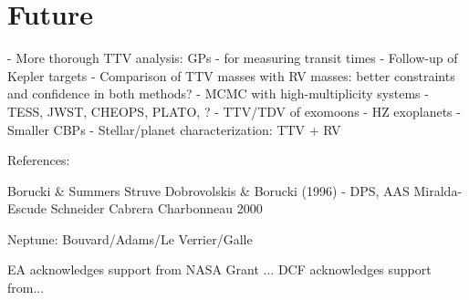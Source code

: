 \documentclass[graybox,natbib,nosecnum]{svmult}
\begin{document}
\section{Future} %
  - More thorough TTV analysis: GPs - for measuring transit times
  - Follow-up of Kepler targets
  - Comparison of TTV masses with RV masses:  better constraints
    and confidence in both methods?
  - MCMC with high-multiplicity systems
  - TESS, JWST, CHEOPS, PLATO, ?
  - TTV/TDV of exomoons
  - HZ exoplanets
  - Smaller CBPs
  - Stellar/planet characterization: TTV + RV

References:

Borucki \& Summers
Struve
Dobrovolskis \& Borucki (1996) - DPS, AAS
Miralda-Escude
Schneider
Cabrera
Charbonneau 2000

Neptune:
Bouvard/Adams/Le Verrier/Galle


%


\begin{acknowledgement}
EA acknowledges support from NASA Grant ...  DCF acknowledges support from...
\end{acknowledgement}

\end{document}
